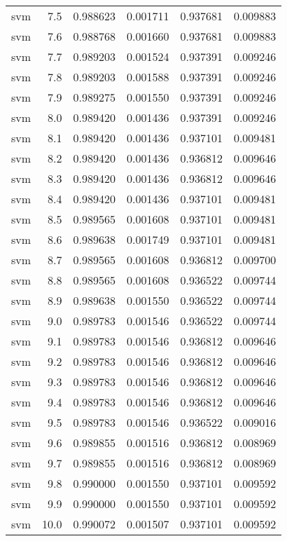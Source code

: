 \begin{tabular}{lrrrrr}
     svm &        7.5 &    0.988623 &   0.001711 &   0.937681 &  0.009883 \\
     svm &        7.6 &    0.988768 &   0.001660 &   0.937681 &  0.009883 \\
     svm &        7.7 &    0.989203 &   0.001524 &   0.937391 &  0.009246 \\
     svm &        7.8 &    0.989203 &   0.001588 &   0.937391 &  0.009246 \\
     svm &        7.9 &    0.989275 &   0.001550 &   0.937391 &  0.009246 \\
     svm &        8.0 &    0.989420 &   0.001436 &   0.937391 &  0.009246 \\
     svm &        8.1 &    0.989420 &   0.001436 &   0.937101 &  0.009481 \\
     svm &        8.2 &    0.989420 &   0.001436 &   0.936812 &  0.009646 \\
     svm &        8.3 &    0.989420 &   0.001436 &   0.936812 &  0.009646 \\
     svm &        8.4 &    0.989420 &   0.001436 &   0.937101 &  0.009481 \\
     svm &        8.5 &    0.989565 &   0.001608 &   0.937101 &  0.009481 \\
     svm &        8.6 &    0.989638 &   0.001749 &   0.937101 &  0.009481 \\
     svm &        8.7 &    0.989565 &   0.001608 &   0.936812 &  0.009700 \\
     svm &        8.8 &    0.989565 &   0.001608 &   0.936522 &  0.009744 \\
     svm &        8.9 &    0.989638 &   0.001550 &   0.936522 &  0.009744 \\
     svm &        9.0 &    0.989783 &   0.001546 &   0.936522 &  0.009744 \\
     svm &        9.1 &    0.989783 &   0.001546 &   0.936812 &  0.009646 \\
     svm &        9.2 &    0.989783 &   0.001546 &   0.936812 &  0.009646 \\
     svm &        9.3 &    0.989783 &   0.001546 &   0.936812 &  0.009646 \\
     svm &        9.4 &    0.989783 &   0.001546 &   0.936812 &  0.009646 \\
     svm &        9.5 &    0.989783 &   0.001546 &   0.936522 &  0.009016 \\
     svm &        9.6 &    0.989855 &   0.001516 &   0.936812 &  0.008969 \\
     svm &        9.7 &    0.989855 &   0.001516 &   0.936812 &  0.008969 \\
     svm &        9.8 &    0.990000 &   0.001550 &   0.937101 &  0.009592 \\
     svm &        9.9 &    0.990000 &   0.001550 &   0.937101 &  0.009592 \\
     svm &       10.0 &    0.990072 &   0.001507 &   0.937101 &  0.009592 \\
\bottomrule
\end{tabular}
